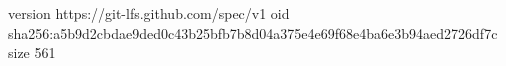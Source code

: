 version https://git-lfs.github.com/spec/v1
oid sha256:a5b9d2cbdae9ded0c43b25bfb7b8d04a375e4e69f68e4ba6e3b94aed2726df7c
size 561

